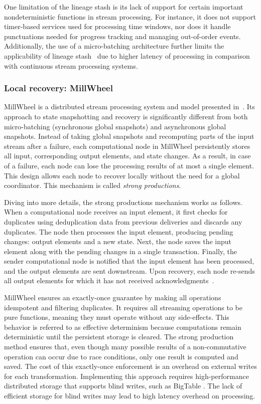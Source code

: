 One limitation of the lineage stash is its lack of support for certain important nondeterministic functions in stream processing. For instance, it does not support timer-based services used for processing time windows, nor does it handle punctuations needed for progress tracking and managing out-of-order events. Additionally, the use of a micro-batching architecture further limits the applicability of lineage stash~\cite{silvestre2021clonos} due to higher latency of processing in comparison with continuous stream processing systems.

\subsubsection{Local recovery: MillWheel}

MillWheel is a distributed stream processing system and model presented in~\cite{Akidau:2013:MFS:2536222.2536229}. Its approach to state snapshotting and recovery is significantly different from both micro-batching (synchronous global snapshots) and asynchronous global snapshots. Instead of taking global snapshots and recomputing parts of the input stream after a failure, each computational node in MillWheel persistently stores all input, corresponding output elements, and state changes. As a result, in case of a failure, each node can lose the processing results of at most a single element. This design allows each node to recover locally without the need for a global coordinator. This mechanism is called {\em strong productions}.

Diving into more details, the strong productions mechanism works as follows. When a computational node receives an input element, it first checks for duplicates using deduplication data from previous deliveries and discards any duplicates. The node then processes the input element, producing pending changes: output elements and a new state. Next, the node saves the input element along with the pending changes in a single transaction. Finally, the sender computational node is notified that the input element has been processed, and the output elements are sent downstream. Upon recovery, each node re-sends all output elements for which it has not received acknowledgments~\cite{Akidau:2013:MFS:2536222.2536229}.

MillWheel ensures an exactly-once guarantee by making all operations idempotent and filtering duplicates. It requires all streaming operations to be pure functions, meaning they must operate without any side-effects. This behavior is referred to as effective determinism \cite{akidau2018streaming} because computations remain deterministic until the persistent storage is cleared. The strong production method ensures that, even though many possible results of a non-commutative operation can occur due to race conditions, only one result is computed and saved. The cost of this exactly-once enforcement is an overhead on external writes for each transformation. Implementing this approach requires high-performance distributed storage that supports blind writes, such as BigTable \cite{chang2008bigtable}. The lack of efficient storage for blind writes may lead to high latency overhead on processing.

